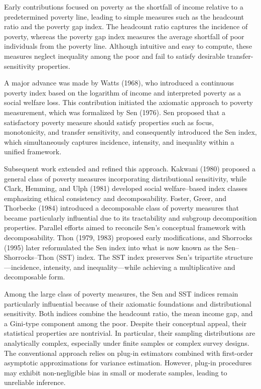 \documentclass[11pt]{article}
\begin{document}
Early contributions focused on poverty as the shortfall of income relative to a predetermined poverty line, leading to simple measures such as the headcount ratio and the poverty gap index. The headcount ratio captures the incidence of poverty, whereas the poverty gap index measures the average shortfall of poor individuals from the poverty line. Although intuitive and easy to compute, these measures neglect inequality among the poor and fail to satisfy desirable transfer-sensitivity properties.

A major advance was made by Watts (1968), who introduced a continuous poverty index based on the logarithm of income and interpreted poverty as a social welfare loss. This contribution initiated the axiomatic approach to poverty measurement, which was formalized by Sen (1976). Sen proposed that a satisfactory poverty measure should satisfy properties such as focus, monotonicity, and transfer sensitivity, and consequently introduced the Sen index, which simultaneously captures incidence, intensity, and inequality within a unified framework.

Subsequent work extended and refined this approach. Kakwani (1980) proposed a general class of poverty measures incorporating distributional sensitivity, while Clark, Hemming, and Ulph (1981) developed social welfare--based index classes emphasizing ethical consistency and decomposability. Foster, Greer, and Thorbecke (1984) introduced a decomposable class of poverty measures that became particularly influential due to its tractability and subgroup decomposition properties. Parallel efforts aimed to reconcile Sen’s conceptual framework with decomposability. Thon (1979, 1983) proposed early modifications, and Shorrocks (1995) later reformulated the Sen index into what is now known as the Sen--Shorrocks--Thon (SST) index. The SST index preserves Sen’s tripartite structure---incidence, intensity, and inequality---while achieving a multiplicative and decomposable form.

Among the large class of poverty measures, the Sen and SST indices remain particularly influential because of their axiomatic foundations and distributional sensitivity. Both indices combine the headcount ratio, the mean income gap, and a Gini-type component among the poor. Despite their conceptual appeal, their statistical properties are nontrivial. In particular, their sampling distributions are analytically complex, especially under finite samples or complex survey designs. The conventional approach relies on plug-in estimators combined with first-order asymptotic approximations for variance estimation. However, plug-in procedures may exhibit non-negligible bias in small or moderate samples, leading to unreliable inference.
\end{document}
